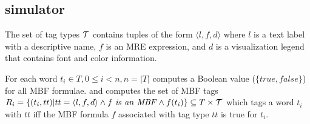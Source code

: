 

%

\subsection{\framework simulator}

The set of tag types ${\cal T}$ contains tuples of the form $\langle l,f,d\rangle$ 
where $l$ is a text label with a descriptive name, 
$f$ is an MRE expression, and $d$ is a visualization legend
that contains font and color information.

For each word $t_i \in T, 0\le i < n, n=|T|$ 
\framework computes a Boolean value 
($\{\mathit{true}, \mathit{false}\}$)
for all MBF formulae. 
and computes the set of MBF tags
$R_i=\{(t_i,tt)| tt=\langle l,f,d\rangle \wedge
f~\mathit{is~an~MBF} \wedge f(t_i)\} \subseteq T \times {\cal T}$
which tags a word $t_i$ with $\mathit{tt}$ 
iff the MBF formula $f$ associated with
tag type $\mathit{tt}$ is true for $t_i$. 

